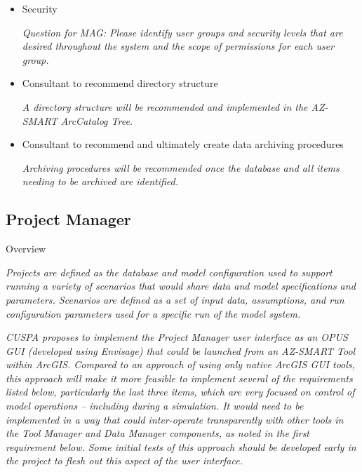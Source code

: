 \documentclass[titlepage]{article}
\begin{document}
\begin{itemize}
\item Security

\emph{Question for MAG: Please identify user groups and security levels that are desired throughout the system and the scope of permissions for each user group.}

\item Consultant to recommend directory structure

\emph{A directory structure will be recommended and implemented in the AZ-SMART ArcCatalog Tree.}

\item Consultant to recommend and ultimately create data archiving procedures

\emph{Archiving procedures will be recommended once the database and all items needing to be archived are identified.}

\end{itemize}


\subsection{Project Manager}

Overview

\emph{Projects are defined as the database and model configuration used to support running a variety of scenarios that would share data and model specifications and parameters.  Scenarios are defined as a set of input data, assumptions, and run configuration parameters used for a specific run of the model system.}  

\emph{CUSPA proposes to implement the Project Manager user interface as an OPUS GUI (developed using Envisage) that could be launched from an AZ-SMART Tool within ArcGIS.  Compared to an approach of using only native ArcGIS GUI tools, this approach will make it more feasible to implement several of the requirements listed below, particularly the last three items, which are very focused on control of model operations -- including during a simulation.  It would need to be implemented in a way that could inter-operate transparently with other tools in the Tool Manager and Data Manager components, as noted in the first requirement below. Some initial tests of this approach should be developed early in the project to flesh out this aspect of the user interface.}
\end{document}
